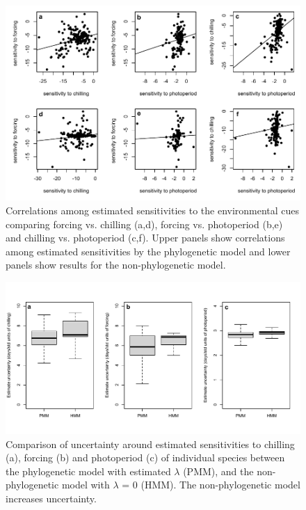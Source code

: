 \documentclass[11pt]{article}
\begin{document}
\clearpage
\begin{figure}
  \begin{center}
  \includegraphics[width=16cm]{../../analyses/phylogeny/figures/FigSX_Sindromes_lamb_lamb0.pdf}
  \caption{Correlations among estimated sensitivities to the environmental cues comparing forcing vs. chilling (a,d), forcing vs. photoperiod (b,e) and chilling vs. photoperiod (c,f). Upper panels show correlations among estimated sensitivities by the phylogenetic model and lower panels show results for the non-phylogenetic model.}
  \label{fig:suppcorrelsens}
  \end{center}
\end{figure}

\clearpage
\begin{figure}
  \begin{center}
  \includegraphics[width=16cm]{../../analyses/phylogeny/figures/FigSXX_cue_uncert_lambest0.pdf}
  \caption{Comparison of uncertainty around estimated sensitivities to chilling (a), forcing (b) and photoperiod (c) of individual species between the phylogenetic model with estimated $\lambda$ (PMM), and the non-phylogenetic model with $\lambda$ = 0 (HMM). The non-phylogenetic model increases uncertainty.}
  \label{fig:suppuncertainties}
  \end{center}
\end{figure}
\end{document}
